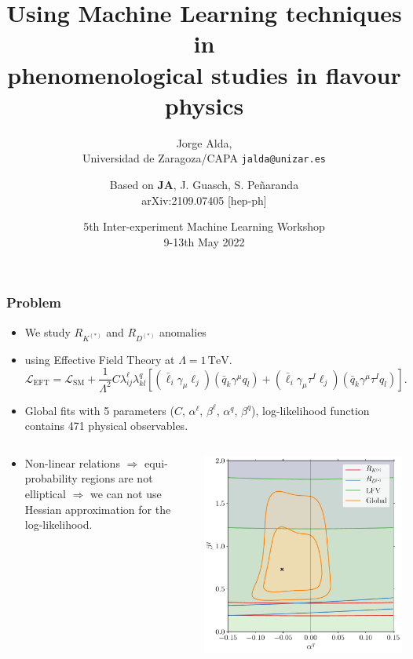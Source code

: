 \documentclass[mathserif, 10pt]{beamer}
\title[Using ML techniques in phenomenological studies in flavour physics]{Using Machine Learning techniques in\\ phenomenological studies in flavour physics}
\subtitle{Jorge Alda,\\ Universidad de Zaragoza/CAPA \hspace{4em} \texttt{jalda@unizar.es} }
\author[Jorge Alda]{Based on \textbf{JA}, J. Guasch, S. Peñaranda \\
arXiv:2109.07405 [hep-ph]}
\date[CERN Workshop]{5th Inter-experiment Machine Learning Workshop\\ 9-13th May 2022}
\begin{document}
\begin{frame}

\titlepage

\end{frame}

\begin{frame}\frametitle{Problem}
\begin{itemize}
    \item We study $R_{K^{(*)}}$ and $R_{D^{(*)}}$ anomalies
    \item using Effective Field Theory at $\Lambda = 1\,\mathrm{TeV}$.
          $$\mathcal{L}_\mathrm{EFT} = \mathcal{L}_\mathrm{SM} + \frac{1}{\Lambda^2} C \lambda^\ell_{ij} \lambda^q_{kl}\left[ (\bar{\ell}_i \gamma_\mu \ell_j)(\bar{q}_k \gamma^\mu  q_l) + (\bar{\ell}_i \gamma_\mu \tau^I \ell_j)(\bar{q}_k \gamma^\mu \tau^I q_l) \right].$$
    \item Global fits with 5 parameters ($C$, $\alpha^\ell$, $\beta^\ell$, $\alpha^q$, $\beta^q$), log-likelihood function contains 471 physical observables.
\end{itemize}
\begin{columns}[onlytextwidth]
    \begin{column}{0.7\textwidth}
        \begin{itemize}
            \item Non-linear relations $\Longrightarrow$ equi-probability regions are not elliptical $\Longrightarrow$ we can not use Hessian approximation for the log-likelihood.
        \end{itemize}
    \end{column}
    \begin{column}{0.25\textwidth}
        \includegraphics[width=\textwidth]{figures/alphabeta_q.pdf}
    \end{column}
\end{columns}
\end{frame}
\end{document}
